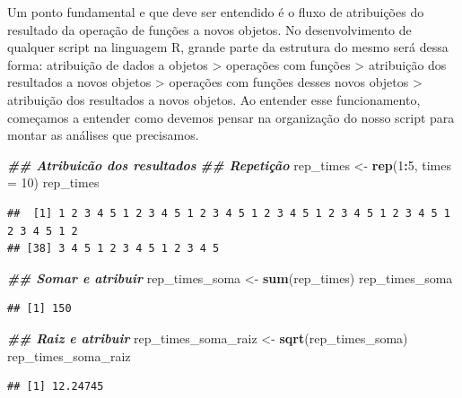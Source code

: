 \documentclass[
]{article}
\newenvironment{Shaded}{\begin{snugshade}}{\end{snugshade}}
\newcommand{\AttributeTok}[1]{\textcolor[rgb]{0.13,0.29,0.53}{#1}}
\newcommand{\DecValTok}[1]{\textcolor[rgb]{0.00,0.00,0.81}{#1}}
\newcommand{\DocumentationTok}[1]{\textcolor[rgb]{0.56,0.35,0.01}{\textbf{\textit{#1}}}}
\newcommand{\FunctionTok}[1]{\textcolor[rgb]{0.13,0.29,0.53}{\textbf{#1}}}
\newcommand{\NormalTok}[1]{#1}
\newcommand{\OtherTok}[1]{\textcolor[rgb]{0.56,0.35,0.01}{#1}}
\newcommand{\SpecialCharTok}[1]{\textcolor[rgb]{0.81,0.36,0.00}{\textbf{#1}}}
\begin{document}
Um ponto fundamental e que deve ser entendido é o fluxo de atribuições do resultado da operação de funções a novos objetos. No desenvolvimento de qualquer script na linguagem R, grande parte da estrutura do mesmo será dessa forma: atribuição de dados a objetos \textgreater{} operações com funções \textgreater{} atribuição dos resultados a novos objetos \textgreater{} operações com funções desses novos objetos \textgreater{} atribuição dos resultados a novos objetos. Ao entender esse funcionamento, começamos a entender como devemos pensar na organização do nosso script para montar as análises que precisamos.

\begin{Shaded}
\begin{Highlighting}[]
\DocumentationTok{\#\# Atribuicão dos resultados}
\DocumentationTok{\#\# Repetição}
\NormalTok{rep\_times }\OtherTok{\textless{}{-}} \FunctionTok{rep}\NormalTok{(}\DecValTok{1}\SpecialCharTok{:}\DecValTok{5}\NormalTok{, }\AttributeTok{times =} \DecValTok{10}\NormalTok{)}
\NormalTok{rep\_times}
\end{Highlighting}
\end{Shaded}

\begin{verbatim}
##  [1] 1 2 3 4 5 1 2 3 4 5 1 2 3 4 5 1 2 3 4 5 1 2 3 4 5 1 2 3 4 5 1 2 3 4 5 1 2
## [38] 3 4 5 1 2 3 4 5 1 2 3 4 5
\end{verbatim}

\begin{Shaded}
\begin{Highlighting}[]
\DocumentationTok{\#\# Somar e atribuir}
\NormalTok{rep\_times\_soma }\OtherTok{\textless{}{-}} \FunctionTok{sum}\NormalTok{(rep\_times)}
\NormalTok{rep\_times\_soma}
\end{Highlighting}
\end{Shaded}

\begin{verbatim}
## [1] 150
\end{verbatim}

\begin{Shaded}
\begin{Highlighting}[]
\DocumentationTok{\#\# Raiz e atribuir}
\NormalTok{rep\_times\_soma\_raiz }\OtherTok{\textless{}{-}} \FunctionTok{sqrt}\NormalTok{(rep\_times\_soma)}
\NormalTok{rep\_times\_soma\_raiz}
\end{Highlighting}
\end{Shaded}

\begin{verbatim}
## [1] 12.24745
\end{verbatim}
\end{document}
